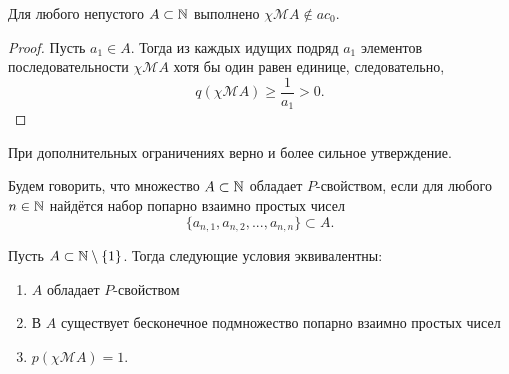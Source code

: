 \begin{proposition}
	Для любого непустого $A\subset \mathbb{N} $ выполнено $\chi\mathscr{M}A \notin ac_0$.
\end{proposition}
\begin{proof}
	Пусть $a_1\in A$.
	Тогда из каждых идущих подряд $a_1$ элементов последовательности $\chi\mathscr{M}A$
	хотя бы один равен единице,
	следовательно,
	\begin{equation}
		q(\chi\mathscr{M}A) \geq \frac{1}{a_1} > 0
		.
	\end{equation}
\end{proof}

При дополнительных ограничениях верно и более сильное утверждение.

\begin{definition}
	\label{def:P-property}
	Будем говорить, что множество $A\subset\mathbb{N}$ обладает $P$-свойством,
	если для любого $n\in\mathbb{N}$ найдётся набор попарно взаимно простых чисел
	\begin{equation}
		\{a_{n,1}, a_{n,2}, ..., a_{n,n}  \} \subset A
		.
	\end{equation}
\end{definition}

\begin{theorem}
	\label{thm:p_x_infinite_multiples}
	Пусть $A\subset \mathbb{N}\setminus\{1\}$.
	Тогда следующие условия эквивалентны:
	\begin{enumerate}[label=(\roman*)]
		\item
			$A$ обладает $P$-свойством
		\item
			В $A$ существует бесконечное подмножество попарно взаимно простых чисел
		\item
			$p(\chi\mathscr{M}A)=1$.
	\end{enumerate}
\end{theorem}

